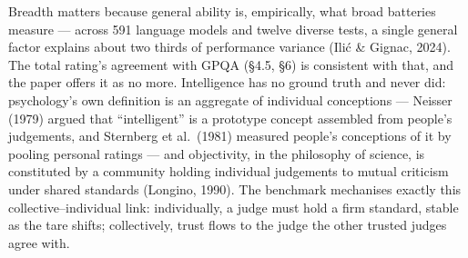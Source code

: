 \documentclass{article}
\begin{document}
\begin{table}[H]
\caption{The eight constructs mapped to the Metanym Game's two tasks (\ensuremath{\bullet} marks a primary demand).}
\label{tab-constructs}
\begin{center}\small
{}
\end{center}
\end{table}

Breadth matters because general ability is, empirically, what broad batteries measure --- across 591 language models and twelve diverse tests, a single general factor explains about two thirds of performance variance (Ili\'{c} \& Gignac, 2024). The total rating's agreement with GPQA (\S{}4.5, \S{}6) is consistent with that, and the paper offers it as no more. Intelligence has no ground truth and never did: psychology's own definition is an aggregate of individual conceptions --- Neisser (1979) argued that ``intelligent'' is a prototype concept assembled from people's judgements, and Sternberg et al.~(1981) measured people's conceptions of it by pooling personal ratings --- and objectivity, in the philosophy of science, is constituted by a community holding individual judgements to mutual criticism under shared standards (Longino, 1990). The benchmark mechanises exactly this collective--individual link: individually, a judge must hold a firm standard, stable as the tare shifts; collectively, trust flows to the judge the other trusted judges agree with.
\end{document}

